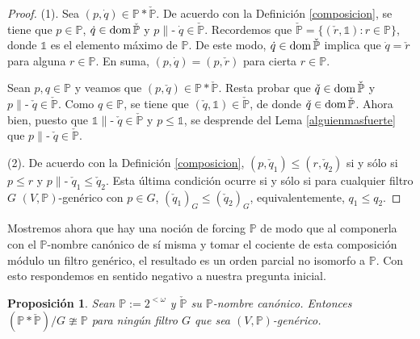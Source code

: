 \documentclass[11pt]{unam_tesis1}
\theoremstyle{MyThmStyle}
\theoremstyle{definition}
\theoremstyle{plain}
\newtheorem{proposition}[definition]{Proposici\'on}
\theoremstyle{remark}
\def\dom{\mathop{\rm dom}\nolimits}
\def\forces{\mathop{\parallel\!\!\!-}\nolimits}
\let\Vdash\forces
\let\leq\leqslant
\begin{document}
\begin{proof}
(1). Sea $(p,\dot q)\in \mathbb P*\check{\mathbb P}$. De acuerdo con la Definici\'on \ref{composicion}, se tiene que $p\in \mathbb P$, $\dot{q}\in \dom \check{\mathbb P}$ y $p\Vdash \dot{q}\in \check{\mathbb P}$. Recordemos que $\check{\mathbb P}=\{(\check{r}, \mathds 1):r\in \mathbb P \}$, donde $\mathds 1$ es el elemento m\'aximo de $\mathbb P$. De este modo, $\dot q\in \dom \check{\mathbb P}$ implica que $\dot {q}= \check {r}$ para alguna $r\in \mathbb P$. En suma, $(p,\dot q)=(p,\check r)$ para cierta $r\in \mathbb P$.

Sean $p,q\in \mathbb P$ y veamos que $(p,\check q)\in \mathbb P*\check{\mathbb P}$. Resta probar que $\check{q}\in \dom \check{\mathbb P}$ y $p\Vdash \check{q}\in \check{\mathbb P}$. Como $q\in \mathbb P$, se tiene que $(\check{q},\mathds 1)\in \check{\mathbb P}$, de donde $\check q\in \dom\check{\mathbb P}$. Ahora bien, puesto que $\mathds 1\Vdash \check{q}\in \check{\mathbb P}$ y $p\leq \mathds 1$, se desprende del Lema \ref{alguienmasfuerte} que $p\Vdash \check{q}\in \check{\mathbb P}$.

(2). De acuerdo con la Definici\'on \ref{composicion}, $(p,\check{q}_1)\leq (r,\check{q}_2)$ si y s\'olo si $p\leq r$ y $p\Vdash \check{q}_1\leq \check{q}_2$. Esta \'ultima condici\'on ocurre si y s\'olo si para cualquier filtro $G$ $(V,\mathbb P)$-gen\'erico con $p\in G$, $(\check q_1)_G\leq (\check q_2)_G$, equivalentemente, $q_1\leq q_2$.
\end{proof}

Mostremos ahora que hay una noci\'on de forcing $\mathbb P$ de modo que al componerla con el $\mathbb P$-nombre can\'onico de s\'i misma y tomar el cociente de esta composici\'on m\'odulo un filtro gen\'erico, el resultado es un orden parcial no isomorfo a $\mathbb P$. Con esto respondemos en sentido negativo a nuestra pregunta inicial.

\begin{proposition}

Sean $\mathbb P:=2^{<\omega}$ y $\check{\mathbb P}$ su $\mathbb P$-nombre can\'onico. Entonces $(\mathbb P*\check{\mathbb P})/G\ncong \mathbb P$ para ning\'un filtro $G$ que sea $(V,\mathbb P)$-gen\'erico.

\end{proposition}
\end{document}
